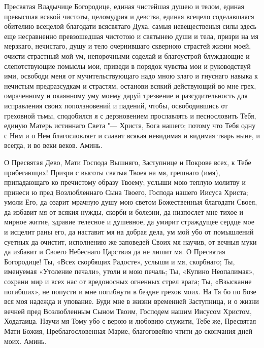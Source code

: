 \begin{mymulticols}


Пресвятая Владычице Богородице, единая чистейшая душею и телом, единая превысшая всякой чистоты, целомудрия и девства, единая всецело соделавшаяся обителию всецелой благодати всясвятаго Духа, самыя невещественыя силы здесь еще несравненно превзошедшая чистотою и святынею души и тела, призри на мя мерзкаго, нечистаго, душу и тело очернившаго скверною страстей жизни моей, очисти страстный мой ум, непорочными соделай и благоустрой блуждающие и слепотствующие помыслы мои, приведи в порядок чувства мои и руководствуй ими, освободи меня от мучительствующаго надо мною злаго и гнуснаго навыка к нечистым предразсудкам и страстям, останови всякий действующий во мне грех, омраченному и окаянному уму моему даруй трезвение и разсудительность для исправления своих поползновений и падений, чтобы, освободившись от греховной тьмы, сподобился я с дерзновением прославлять и песнословить Тебя, единую Матерь истиннаго Света "--- Христа, Бога нашего; потому что Тебя одну с Ним и о Нем благословляет и славит всякая невидимая и видимая тварь ныне, и всегда, и во веки веков. Аминь.




О Пресвятая Дево, Мати Господа Вышняго, Заступнице и Покрове всех, к Тебе прибегающих! Призри с высоты святыя Твоея на мя, грешнаго (имя), припадающаго ко пречистому образу Твоему; услыши мою теплую молитву и принеси ю пред Возлюбленнаго Сына Твоего, Господа нашего Иисуса Христа; умоли Его, да озарит мрачную душу мою светом Божественныя благодати Своея, да избавит мя от всякия нужды, скорби и болезни, да низпослет мне тихое и мирное житие, здравие телесное и душевное, да умирит страждущее сердце мое и исцелит раны его, да наставит мя на добрая дела, ум мой убо от помышлений суетных да очистит, исполнению же заповедей Своих мя научив, от вечныя муки да избавит и Своего Небеснаго Царствия да не лишит мя. О Пресвятая Богородице! Ты, «Всех скорбящих Радосте», услыши и мя, скорбнаго; Ты, именуемая «Утоление печали», утоли и мою печаль; Ты, «Купино Неопалимая», сохрани мир и всех нас от вредоносных огненных стрел врага; Ты, «Взыскание погибших», не попусти и мне погибнути в бездне грехов моих. На Тя бо по Бозе вся моя надежда и упование. Буди мне в жизни временней Заступница, и о жизни вечней пред Возлюбленным Сыном Твоим, Господем нашим Иисусом Христом, Ходатаица. Научи мя Тому убо с верою и любовию служити, Тебе же, Пресвятая Мати Божия, Преблагословенная Марие, благоговейно чтити до скончания дней моих. Аминь.

\end{mymulticols}

